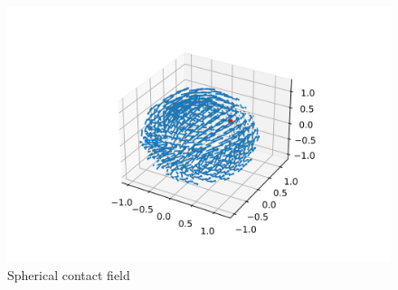 \begin{figure}[h!]
    \centering
    \includegraphics[width=\linewidth]{Images/sphericalfield.png}
    \caption{Spherical contact field}
    \label{fig:spherical}
\end{figure}
